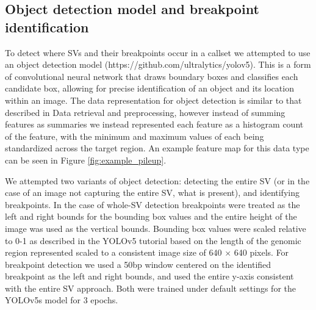 \subsection{Object detection model and breakpoint identification}

To detect where SVs and their breakpoints occur in a callset we attempted to use an object detection model (https://github.com/ultralytics/yolov5). This is a form of convolutional neural network that draws boundary boxes and classifies each candidate box, allowing for precise identification of an object and its location within an image. The data representation for object detection is similar to that described in Data retrieval and preprocessing, however instead of summing features as summaries we instead represented each feature as a histogram count of the feature, with the minimum and maximum values of each being standardized across the target region. An example feature map for this data type can be seen in Figure \ref{fig:example_pileup}. 

We attempted two variants of object detection: detecting the entire SV (or in the case of an image not capturing the entire SV, what is present), and identifying breakpoints. In the case of whole-SV detection breakpoints were treated as the left and right bounds for the bounding box values and the entire height of the image was used as the vertical bounds. Bounding box values were scaled relative to 0-1 as described in the YOLOv5 tutorial based on the length of the genomic region represented scaled to a consistent image size of 640 $\times$ 640 pixels. For breakpoint detection we used a 50bp window centered on the identified breakpoint as the left and right bounds, and used the entire y-axis consistent with the entire SV approach. Both were trained under default settings for the YOLOv5s model for 3 epochs.

